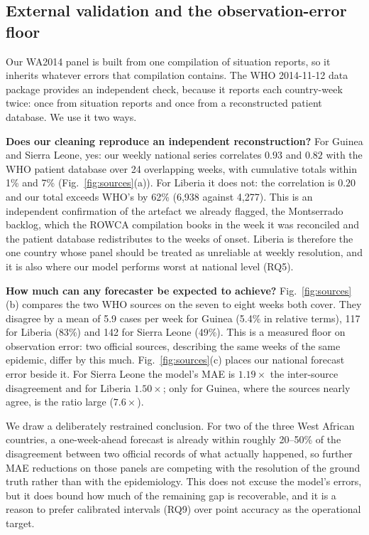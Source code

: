 \documentclass[conference]{IEEEtran}
\begin{document}
\subsection{External validation and the observation-error floor}\label{sec:sources}

Our WA2014 panel is built from one compilation of situation reports, so it inherits whatever errors that compilation contains. The WHO 2014-11-12 data package provides an independent check, because it reports each country-week twice: once from situation reports and once from a reconstructed patient database. We use it two ways.

\textbf{Does our cleaning reproduce an independent reconstruction?} For Guinea and Sierra Leone, yes: our weekly national series correlates $0.93$ and $0.82$ with the WHO patient database over 24 overlapping weeks, with cumulative totals within 1\% and 7\% (Fig.~\ref{fig:sources}(a)). For Liberia it does not: the correlation is $0.20$ and our total exceeds WHO's by 62\% (6{,}938 against 4{,}277). This is an independent confirmation of the artefact we already flagged, the Montserrado backlog, which the ROWCA compilation books in the week it was reconciled and the patient database redistributes to the weeks of onset. Liberia is therefore the one country whose panel should be treated as unreliable at weekly resolution, and it is also where our model performs worst at national level (RQ5).

\textbf{How much can any forecaster be expected to achieve?} Fig.~\ref{fig:sources}(b) compares the two WHO sources on the seven to eight weeks both cover. They disagree by a mean of 5.9 cases per week for Guinea (5.4\% in relative terms), 117 for Liberia (83\%) and 142 for Sierra Leone (49\%). This is a measured floor on observation error: two official sources, describing the same weeks of the same epidemic, differ by this much. Fig.~\ref{fig:sources}(c) places our national forecast error beside it. For Sierra Leone the model's MAE is $1.19\times$ the inter-source disagreement and for Liberia $1.50\times$; only for Guinea, where the sources nearly agree, is the ratio large ($7.6\times$).

We draw a deliberately restrained conclusion. For two of the three West African countries, a one-week-ahead forecast is already within roughly 20--50\% of the disagreement between two official records of what actually happened, so further MAE reductions on those panels are competing with the resolution of the ground truth rather than with the epidemiology. This does not excuse the model's errors, but it does bound how much of the remaining gap is recoverable, and it is a reason to prefer calibrated intervals (RQ9) over point accuracy as the operational target.
\end{document}
